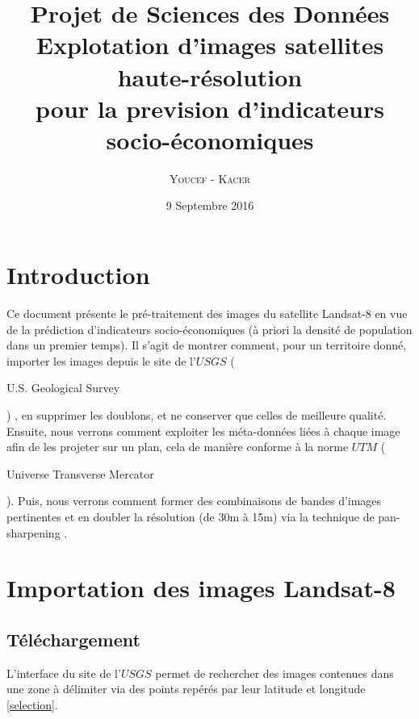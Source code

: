 \documentclass{book}
\title{%
  Projet de Sciences des Données \\
  \large Explotation d'images satellites haute-résolution \\pour la prevision d'indicateurs socio-économiques \\
    }
\author{\textsc{Youcef} - \textsc{Kacer}}
\date{9 Septembre 2016}
\begin{document}
 
\maketitle

\tableofcontents

\frontmatter
\chapter{Introduction}
Ce document présente le pré-traitement des images du satellite Landsat-8 en vue de la prédiction d'indicateurs socio-économiques (à 
priori la densité de population dans un premier temps). Il s'agit de montrer comment, pour un territoire donné,
importer les images depuis le site de l'$USGS$ (\begin{itshape}U.S. Geological Survey\end{itshape}) \cite{landsat8}, en supprimer les doublons, et ne conserver 
que celles de meilleure qualité.
Ensuite, nous verrons comment exploiter les méta-données liées à chaque image afin de les projeter sur un plan, cela de manière conforme
à la norme $UTM$ (\begin{itshape}Universe Transverse Mercator\end{itshape}).
Puis, nous verrons comment former des combinaisons de bandes d'images pertinentes et en doubler la résolution (de 30m à 15m) via
la technique de \og pan-sharpening \fg{}.
\mainmatter

\chapter{Importation des images Landsat-8}
\section{Téléchargement}

L'interface du site de l'$USGS$ permet de rechercher des images contenues dans une zone à délimiter via des points repérés par 
leur latitude et longitude \ref{selection}.\\
\end{document}
